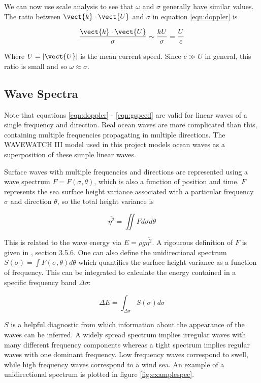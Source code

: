 We can now use scale analysis to see that $\omega$ and $\sigma$ generally have similar values. The ratio between $\vect{k}\cdot\vect{U}$ and $\sigma$ in equation \ref{eqn:doppler} is

\[
\frac{\vect{k}\cdot\vect{U}}{\sigma} \sim \frac{kU}{\sigma} = \frac U c
\]

Where $U = |\vect{U}|$ is the mean current speed. Since $c \gg U$ in general, this ratio is small and so $\omega \approx \sigma$.

\subsection{Wave Spectra}
\label{sec:wavespectra}

Note that equations \ref{eqn:doppler} - \ref{eqn:gspeed} are valid for linear waves of a single frequency and direction. Real ocean waves are more complicated than this, containing multiple frequencies propagating in multiple directions. The WAVEWATCH III model used in this project models ocean waves as a superposition of these simple linear waves.

Surface waves with multiple frequencies and directions are represented using a wave spectrum $F = F(\sigma,\theta)$, which is also a function of position and time. $F$ represents the sea surface height variance associated with a particular frequency $\sigma$ and direction $\theta$, so the total height variance is 

\begin{equation}
\overline{\eta^2} = \iint F d\sigma d\theta
\label{eqn:waveenergy}
\end{equation}

This is related to the wave energy via $E = \rho g \overline{\eta^2}$. A rigourous definition of $F$ is given in \citet{Holthuijsen2007}, section 3.5.6. One can also define the unidirectional spectrum $S(\sigma) = \int F(\sigma,\theta) d\theta$ which quantifies the surface height variance as a function of frequency. This can be integrated to calculate the energy contained in a specific frequency band $\Delta \sigma$:

\begin{equation}
\Delta E = \int_{\Delta \sigma} S(\sigma) d\sigma
\end{equation}

$S$ is a helpful diagnostic from which information about the appearance of the waves can be inferred. A widely spread spectrum implies irregular waves with many different frequency components whereas a tight spectrum implies regular waves with one dominant frequency. Low frequency waves correspond to swell, while high frequency waves correspond to a wind sea. An example of a unidirectional spectrum is plotted in figure \ref{fig:examplespec}.

